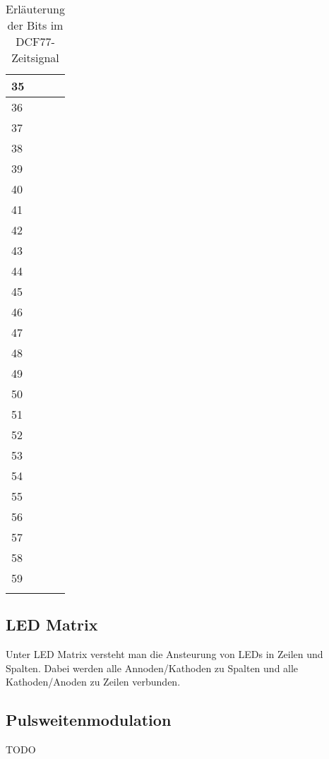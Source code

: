 \begin{longtable}{|l|l|}
35 & \\\hline
36 & \\\hline
37 & \\\hline
38 & \\\hline
39 & \\\hline
40 & \\\hline
41 & \\\hline
42 & \\\hline
43 & \\\hline
44 & \\\hline
45 & \\\hline
46 & \\\hline
47 & \\\hline
48 & \\\hline
49 & \\\hline
50 & \\\hline
51 & \\\hline
52 & \\\hline
53 & \\\hline
54 & \\\hline
55 & \\\hline
56 & \\\hline
57 & \\\hline
58 & \\\hline
59 & \\\hline
\caption{Erläuterung der Bits im DCF77-Zeitsignal}\label{tbl_dcf77kod}
\end{longtable}
%
\subsection{LED Matrix}
Unter LED Matrix versteht man die Ansteurung von LEDs in Zeilen und Spalten. Dabei werden alle Annoden/Kathoden zu Spalten und alle Kathoden/Anoden zu Zeilen
verbunden. 

\subsection{Pulsweitenmodulation}\label{sec_pulsweitenmodulation}
TODO
